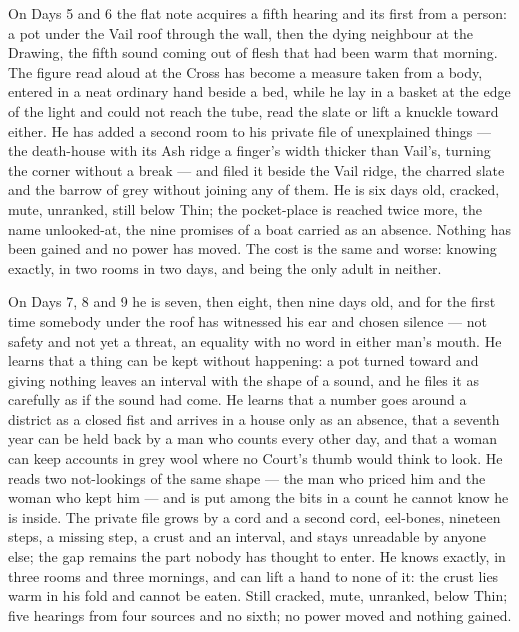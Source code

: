 \documentclass{design/chronicle}
\begin{document}
{On Days 5 and 6 the flat note acquires a fifth hearing and its first from a person: a pot under the Vail roof through the wall, then the dying neighbour at the Drawing, the fifth sound coming out of flesh that had been warm that morning. The figure read aloud at the Cross has become a measure taken from a body, entered in a neat ordinary hand beside a bed, while he lay in a basket at the edge of the light and could not reach the tube, read the slate or lift a knuckle toward either. He has added a second room to his private file of unexplained things --- the death-house with its Ash ridge a finger’s width thicker than Vail’s, turning the corner without a break --- and filed it beside the Vail ridge, the charred slate and the barrow of grey without joining any of them. He is six days old, cracked, mute, unranked, still below Thin; the pocket-place is reached twice more, the name unlooked-at, the nine promises of a boat carried as an absence. Nothing has been gained and no power has moved. The cost is the same and worse: knowing exactly, in two rooms in two days, and being the only adult in neither.

On Days 7, 8 and 9 he is seven, then eight, then nine days old, and for the first time somebody under the roof has witnessed his ear and chosen silence --- not safety and not yet a threat, an equality with no word in either man’s mouth. He learns that a thing can be kept without happening: a pot turned toward and giving nothing leaves an interval with the shape of a sound, and he files it as carefully as if the sound had come. He learns that a number goes around a district as a closed fist and arrives in a house only as an absence, that a seventh year can be held back by a man who counts every other day, and that a woman can keep accounts in grey wool where no Court’s thumb would think to look. He reads two not-lookings of the same shape --- the man who priced him and the woman who kept him --- and is put among the bits in a count he cannot know he is inside. The private file grows by a cord and a second cord, eel-bones, nineteen steps, a missing step, a crust and an interval, and stays unreadable by anyone else; the gap remains the part nobody has thought to enter. He knows exactly, in three rooms and three mornings, and can lift a hand to none of it: the crust lies warm in his fold and cannot be eaten. Still cracked, mute, unranked, below Thin; five hearings from four sources and no sixth; no power moved and nothing gained.

}
\end{document}
